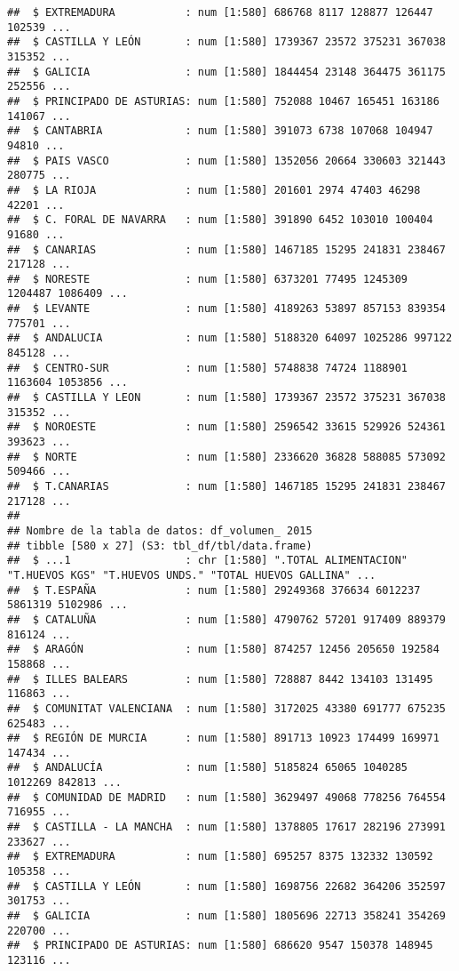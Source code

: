 \documentclass[
]{article}
\begin{document}
\begin{verbatim}
##  $ EXTREMADURA           : num [1:580] 686768 8117 128877 126447 102539 ...
##  $ CASTILLA Y LEÓN       : num [1:580] 1739367 23572 375231 367038 315352 ...
##  $ GALICIA               : num [1:580] 1844454 23148 364475 361175 252556 ...
##  $ PRINCIPADO DE ASTURIAS: num [1:580] 752088 10467 165451 163186 141067 ...
##  $ CANTABRIA             : num [1:580] 391073 6738 107068 104947 94810 ...
##  $ PAIS VASCO            : num [1:580] 1352056 20664 330603 321443 280775 ...
##  $ LA RIOJA              : num [1:580] 201601 2974 47403 46298 42201 ...
##  $ C. FORAL DE NAVARRA   : num [1:580] 391890 6452 103010 100404 91680 ...
##  $ CANARIAS              : num [1:580] 1467185 15295 241831 238467 217128 ...
##  $ NORESTE               : num [1:580] 6373201 77495 1245309 1204487 1086409 ...
##  $ LEVANTE               : num [1:580] 4189263 53897 857153 839354 775701 ...
##  $ ANDALUCIA             : num [1:580] 5188320 64097 1025286 997122 845128 ...
##  $ CENTRO-SUR            : num [1:580] 5748838 74724 1188901 1163604 1053856 ...
##  $ CASTILLA Y LEON       : num [1:580] 1739367 23572 375231 367038 315352 ...
##  $ NOROESTE              : num [1:580] 2596542 33615 529926 524361 393623 ...
##  $ NORTE                 : num [1:580] 2336620 36828 588085 573092 509466 ...
##  $ T.CANARIAS            : num [1:580] 1467185 15295 241831 238467 217128 ...
##  
## Nombre de la tabla de datos: df_volumen_ 2015 
## tibble [580 x 27] (S3: tbl_df/tbl/data.frame)
##  $ ...1                  : chr [1:580] ".TOTAL ALIMENTACION" "T.HUEVOS KGS" "T.HUEVOS UNDS." "TOTAL HUEVOS GALLINA" ...
##  $ T.ESPAÑA              : num [1:580] 29249368 376634 6012237 5861319 5102986 ...
##  $ CATALUÑA              : num [1:580] 4790762 57201 917409 889379 816124 ...
##  $ ARAGÓN                : num [1:580] 874257 12456 205650 192584 158868 ...
##  $ ILLES BALEARS         : num [1:580] 728887 8442 134103 131495 116863 ...
##  $ COMUNITAT VALENCIANA  : num [1:580] 3172025 43380 691777 675235 625483 ...
##  $ REGIÓN DE MURCIA      : num [1:580] 891713 10923 174499 169971 147434 ...
##  $ ANDALUCÍA             : num [1:580] 5185824 65065 1040285 1012269 842813 ...
##  $ COMUNIDAD DE MADRID   : num [1:580] 3629497 49068 778256 764554 716955 ...
##  $ CASTILLA - LA MANCHA  : num [1:580] 1378805 17617 282196 273991 233627 ...
##  $ EXTREMADURA           : num [1:580] 695257 8375 132332 130592 105358 ...
##  $ CASTILLA Y LEÓN       : num [1:580] 1698756 22682 364206 352597 301753 ...
##  $ GALICIA               : num [1:580] 1805696 22713 358241 354269 220700 ...
##  $ PRINCIPADO DE ASTURIAS: num [1:580] 686620 9547 150378 148945 123116 ...

\end{verbatim}
\end{document}
